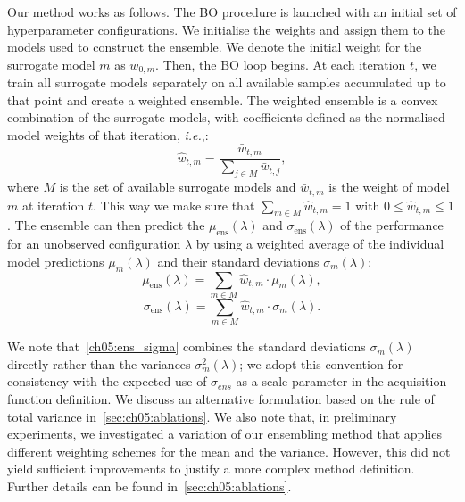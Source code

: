 Our method works as follows.
The BO procedure is launched with an initial set of hyperparameter configurations. We initialise the weights and assign them to the models used to construct the ensemble. We denote the initial weight for the surrogate model $m$ as $w_{0,m}$. 
Then, the BO loop begins. At each iteration $t$, we train all surrogate models separately on all available samples accumulated up to that point and create a weighted ensemble. The weighted ensemble is a convex combination of the surrogate models, with coefficients defined as the normalised model weights of that iteration, \emph{i.e.},:
\begin{equation}
    \hat{w}_{t,m} = \frac{\bar{w}_{t,m}}{\sum_{j\in M}{\bar{w}_{t, j}}},
\end{equation}
where $M$ is the set of available surrogate models and $\bar{w}_{t,m}$ is the weight of model $m$ at iteration $t$. This way we make sure that $\sum_{m\in M} \hat{w}_{t,m} = 1$ with $0\leq \hat{w}_{t,m} \leq 1$.
The ensemble can then predict the $\mu_{\text{ens}}(\lambda)$ and $\sigma_{\text{ens}}(\lambda)$ of the performance for an unobserved configuration $\lambda$ by using a weighted average 
of the individual model predictions $\mu_m(\lambda)$ and their standard deviations $\sigma_m(\lambda)$:
\begin{equation}
    \mu_{\text{ens}}(\lambda)= \sum_{m\in M} \hat{w}_{t,m} \cdot \mu_{m}(\lambda),
    \label{ch05:ens_mu}
\end{equation}
\begin{equation}
    \sigma_{\text{ens}}(\lambda)= \sum_{m\in M} \hat{w}_{t,m} \cdot \sigma_{m}(\lambda).
    \label{ch05:ens_sigma}
\end{equation}

We note that~\cref{ch05:ens_sigma} combines the standard deviations $\sigma_{m}(\lambda)$ directly rather than the variances $\sigma_{m}^{2}(\lambda)$; we adopt this convention for consistency with the expected use of $\sigma_{ens}$ as a scale parameter in the acquisition function definition.
We discuss an alternative formulation based on the rule of total variance in~\cref{sec:ch05:ablations}.
We also note that, in preliminary experiments, we investigated a variation of our ensembling method that applies different weighting schemes for the mean and the variance. However, this did not yield sufficient improvements to justify a more complex method definition. Further details can be found in~\cref{sec:ch05:ablations}.

